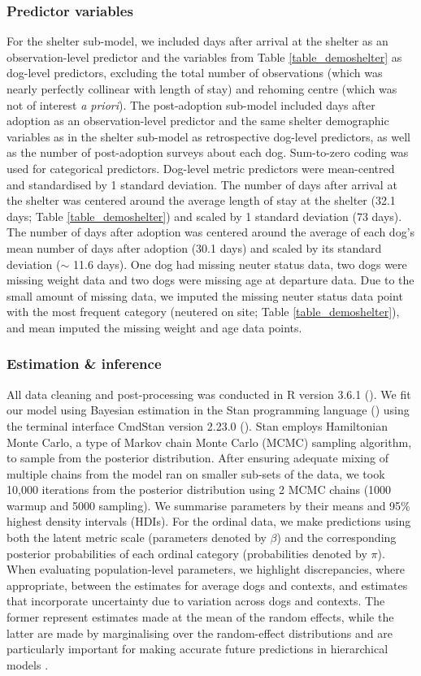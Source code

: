 \documentclass[fleqn,10pt]{wlscirep}
\begin{document}
\subsubsection*{Predictor variables}
For the shelter sub-model, we included days after arrival at the shelter as an observation-level predictor and the variables from Table \ref{table_demoshelter} as dog-level predictors, excluding the total number of observations (which was nearly perfectly collinear with length of stay) and rehoming centre (which was not of interest \textit{a priori}). The post-adoption sub-model included days after adoption as an observation-level predictor and the same shelter demographic variables as in the shelter sub-model as retrospective dog-level predictors, as well as the number of post-adoption surveys about each dog. Sum-to-zero coding was used for categorical predictors. Dog-level metric predictors were mean-centred and standardised by 1 standard deviation. The number of days after arrival at the shelter was centered around the average length of stay at the shelter (32.1 days; Table \ref{table_demoshelter}) and scaled by 1 standard deviation (73 days). The number of days after adoption was centered around the average of each dog's mean number of days after adoption (30.1 days) and scaled by its standard deviation ($\sim$ 11.6 days). One dog had missing neuter status data, two dogs were missing weight data and two dogs were missing age at departure data. Due to the small amount of missing data, we imputed the missing neuter status data point with the most frequent category (neutered on site; Table \ref{table_demoshelter}), and mean imputed the missing weight and age data points.

\subsubsection*{Estimation \& inference}
All data cleaning and post-processing was conducted in R version 3.6.1 (\cite{rcoreteam2019}). We fit our model using Bayesian estimation in the Stan programming language (\cite{stan2018}) using the terminal interface CmdStan version 2.23.0 (\cite{cmdstan2018}). Stan employs Hamiltonian Monte Carlo, a type of Markov chain Monte Carlo (MCMC) sampling algorithm, to sample from the posterior distribution. After ensuring adequate mixing of multiple chains from the model ran on smaller sub-sets of the data, we took 10,000 iterations from the posterior distribution using 2 MCMC chains (1000 warmup and 5000 sampling). We summarise parameters by their means and 95\% highest density intervals (HDIs). For the ordinal data, we make predictions using both the latent metric scale (parameters denoted by $\beta$) and the corresponding posterior probabilities of each ordinal category (probabilities denoted by $\pi$). When evaluating population-level parameters, we highlight discrepancies, where appropriate, between the estimates for average dogs and contexts, and estimates that incorporate uncertainty due to variation across dogs and contexts. The former represent estimates made at the mean of the random effects, while the latter are made by marginalising over the random-effect distributions and are particularly important for making accurate future predictions in hierarchical models \cite{inthout2016,wang2019}.
\end{document}
